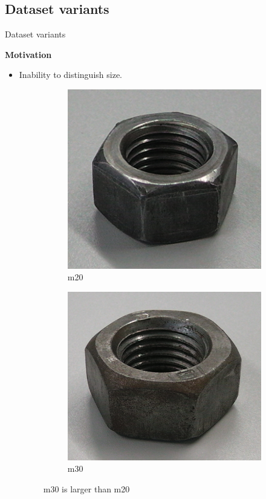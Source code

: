 \documentclass{beamer}
\begin{document}
\subsection{Dataset variants}

\begin{frame}{Dataset variants}
\label{slide:motivvariants}

	\textbf{Motivation}
	\begin{small}
	
		\begin{itemize}
			\item Inability to distinguish size.
				\begin{figure}
				\centering
				\begin{subfigure}{.2\textwidth}
  					\centering
  					\includegraphics[width=.35\linewidth]{images/M20}
  					\caption{m20 \cite{github_robocup@work}}
  					\label{Fig:size1}
				\end{subfigure}%
				\begin{subfigure}{.2\textwidth}
  					\centering
  					\includegraphics[width=.35\linewidth]{images/M30}
  					\caption{m30 \cite{github_robocup@work}}
  					\label{Fig:size2}
				\end{subfigure}%
				\caption{m30 is larger than m20}
				\label{Fig:size}
				\end{figure}
				

\end{itemize}
\end{small}
\end{frame}
\end{document}
